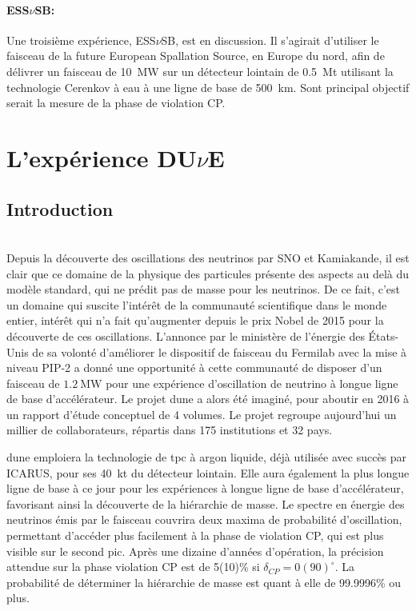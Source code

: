             \paragraph{ESS$\nu$SB\cite{Acciarri2016}:} Une troisième expérience, ESS$\nu$SB, est en discussion\cite{essnusb}. Il s'agirait d'utiliser le faisceau de la future European Spallation Source, en Europe du nord, afin de délivrer un faisceau de \SI{10}{\mega\watt} sur un détecteur lointain de \SI{0.5}{\mega\tonne} utilisant la technologie Cerenkov à eau à une ligne de base de \SI{500}{\kilo\meter}. Sont principal objectif serait la mesure de la phase de violation CP.
    
    \section{L'expérience \texorpdfstring{DU$\nu$E}{DUNE}}\label{sec::dune}
    
        \subsection{Introduction}
            \cite{Acciarri2016}\\
            Depuis la découverte des oscillations des neutrinos par SNO et Kamiakande, il est clair que ce domaine de la physique des particules présente des aspects au delà du modèle standard, qui ne prédit pas de masse pour les neutrinos. De ce fait, c'est un domaine qui suscite l'intérêt de la communauté scientifique dans le monde entier, intérêt qui n'a fait qu'augmenter depuis le prix Nobel de 2015 pour la découverte de ces oscillations. L'annonce par le ministère de l'énergie des États-Unis de sa volonté d'améliorer le dispositif de faisceau du Fermilab avec la mise à niveau PIP-2 a donné une opportunité à cette communauté de disposer d'un faisceau de $\SI{1.2}{\mega\watt}$ pour une expérience d'oscillation de neutrino à longue ligne de base d'accélérateur. Le projet \gls{dune} a alors été imaginé, pour aboutir en 2016 à un rapport d'étude conceptuel de 4 volumes. Le projet regroupe aujourd'hui un millier de collaborateurs, répartis dans 175 institutions et 32 pays.
            
            \gls{dune} emploiera la technologie de \gls{tpc} à argon liquide, déjà utilisée avec succès par ICARUS, pour ses \SI{40}{\kilo\tonne} du détecteur lointain. Elle aura également la plus longue ligne de base à ce jour pour les expériences à longue ligne de base d'accélérateur, favorisant ainsi la découverte de la hiérarchie de masse. Le spectre en énergie des neutrinos émis par le faisceau couvrira deux maxima de probabilité d'oscillation, permettant d'accéder plus facilement à la phase de violation CP, qui est plus visible sur le second pic. Après une dizaine d'années d'opération, la précision attendue sur la phase violation CP est de 5(10)\% si $\delta_{CP}=0(90)^{\circ}$. La probabilité de déterminer la hiérarchie de masse est quant à elle de 99.9996\%\cite{Acciarri2016} ou plus.

